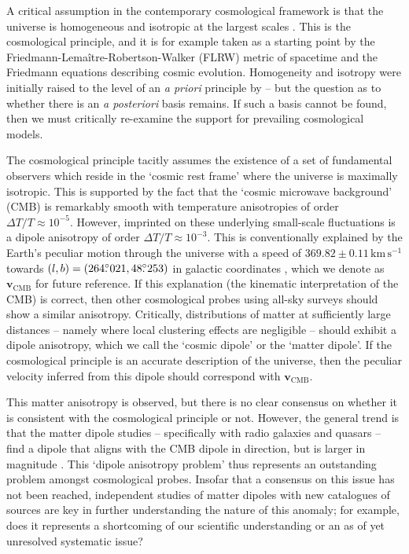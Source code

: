 \documentclass[fleqn,usenatbib]{mnras}
\newcommand{\dotdeg}{\rlap{.}^\circ}
\begin{document}
    A critical assumption in the contemporary cosmological framework is that the universe is homogeneous and isotropic at the largest scales \citep{harrison2000}.
    This is the cosmological principle, and it is for example taken as a starting point by the Friedmann-Lema\^{i}tre-Robertson-Walker (FLRW) metric of spacetime and the Friedmann equations describing cosmic evolution.
    Homogeneity and isotropy were initially raised to the level of an \textit{a priori} principle by \citet{milne1935} -- but the question as to whether there is an \textit{a posteriori} basis remains.
    If such a basis cannot be found, then we must critically re-examine the support for prevailing cosmological models.
    
    The cosmological principle tacitly assumes the existence of a set of fundamental observers which reside in the `cosmic rest frame' where the universe is maximally isotropic.
    This is supported by the fact that the `cosmic microwave background' (CMB) is remarkably smooth with temperature anisotropies of order $\Delta T / T \approx 10^{-5}$. 
    However, imprinted on these underlying small-scale fluctuations is a dipole anisotropy of order $\Delta T / T \approx 10^{-3}$. 
    This is conventionally explained by the Earth's peculiar motion through the universe with a speed of $369.82\pm0.11\,\text{km}\,\text{s}^{-1}$ towards $(l,b) = (264\dotdeg021, 48\dotdeg253)$ in galactic coordinates \citep{planck2020}, which we denote as $\mathbf{v}_\text{CMB}$ for future reference.
    If this explanation (the kinematic interpretation of the CMB) is correct, then other cosmological probes using all-sky surveys should show a similar anisotropy.
    Critically, distributions of matter at sufficiently large distances -- namely where local clustering effects are negligible -- should exhibit a dipole anisotropy, which we call the `cosmic dipole' or the `matter dipole'.
    If the cosmological principle is an accurate description of the universe, then the peculiar velocity inferred from this dipole should correspond with $\mathbf{v}_\text{CMB}$.
    
    This matter anisotropy is observed, but there is no clear consensus on whether it is consistent with the cosmological principle or not.
    However, the general trend is that the matter dipole studies -- specifically with radio galaxies and quasars -- find a dipole that aligns with the CMB dipole in direction, but is larger in magnitude \citep{Peebles_2022, aluri2023}.
    This `dipole anisotropy problem' thus represents an outstanding problem amongst cosmological probes.
    Insofar that a consensus on this issue has not been reached, independent studies of matter dipoles with new catalogues of sources are key in further understanding the nature of this anomaly; for example, does it represents a shortcoming of our scientific understanding or an as of yet unresolved systematic issue?
\end{document}
